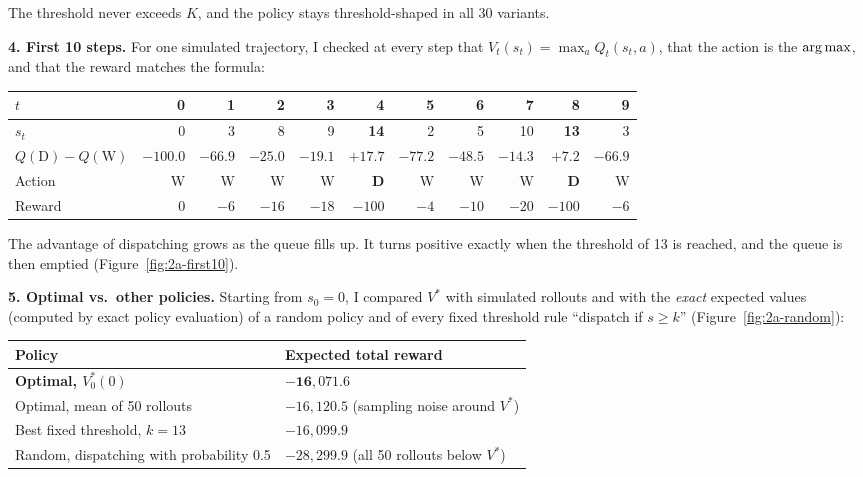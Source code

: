 
The threshold never exceeds $K$, and the policy stays threshold-shaped in all 30 variants.

\textbf{4. First 10 steps.} For one simulated trajectory, I checked at every step that $V_t(s_t) = \max_a Q_t(s_t, a)$, that the action is the $\operatorname*{arg\,max}$, and that the reward matches the formula:

\begin{center}
\small
\setlength{\tabcolsep}{4.5pt}
\begin{tabular}{@{}l*{10}{r}@{}}
  \toprule
  $t$ & 0 & 1 & 2 & 3 & 4 & 5 & 6 & 7 & 8 & 9 \\
  \midrule
  $s_t$ & 0 & 3 & 8 & 9 & \textbf{14} & 2 & 5 & 10 & \textbf{13} & 3 \\
  $Q(\text{D}) - Q(\text{W})$ & $-100.0$ & $-66.9$ & $-25.0$ & $-19.1$ & $\mathbf{+17.7}$ & $-77.2$ & $-48.5$ & $-14.3$ & $\mathbf{+7.2}$ & $-66.9$ \\
  Action & W & W & W & W & \textbf{D} & W & W & W & \textbf{D} & W \\
  Reward & 0 & $-6$ & $-16$ & $-18$ & $-100$ & $-4$ & $-10$ & $-20$ & $-100$ & $-6$ \\
  \bottomrule
\end{tabular}
\end{center}


The advantage of dispatching grows as the queue fills up. It turns positive exactly when the threshold of 13 is reached, and the queue is then emptied (Figure~\ref{fig:2a-first10}).

\textbf{5. Optimal vs.\ other policies.} Starting from $s_0 = 0$, I compared $V^*$ with simulated rollouts and with the \emph{exact} expected values (computed by exact policy evaluation) of a random policy and of every fixed threshold rule ``dispatch if $s \geq k$'' (Figure~\ref{fig:2a-random}):

\begin{center}
\begin{tabular}{@{}ll@{}}
  \toprule
  \textbf{Policy} & \textbf{Expected total reward} \\
  \midrule
  \textbf{Optimal, $V^*_0(0)$} & $\mathbf{-16{,}071.6}$ \\
  Optimal, mean of 50 rollouts & $-16{,}120.5$ (sampling noise around $V^*$) \\
  Best fixed threshold, $k = 13$ & $-16{,}099.9$ \\
  Random, dispatching with probability 0.5 & $-28{,}299.9$ (all 50 rollouts below $V^*$) \\
  \bottomrule
\end{tabular}
\end{center}

